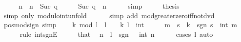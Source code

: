 \begin{isabellebody}
\ \ \isamarkupfalse%
\ \isamarkupfalse%
\ n\ \ {\isachardoublequoteopen}n\ {\isacharequal}{\kern0pt}\ Suc\ q{\isachardoublequoteclose}\isanewline
\ \ \isamarkupfalse%
\ \isamarkupfalse%
\ {\isachardoublequoteopen}Suc\ q\ {\isacharequal}{\kern0pt}\ n{\isachardoublequoteclose}\isanewline
\ \ \ \ \isamarkupfalse%
\ simp\isanewline
\ \ \isamarkupfalse%
\ \isamarkupfalse%
\ {\isacharquery}{\kern0pt}thesis\isanewline
\ \ \ \ \isamarkupfalse%
\ {\isacharparenleft}{\kern0pt}simp\ only{\isacharcolon}{\kern0pt}\ modulo{\isacharunderscore}{\kern0pt}int{\isacharunderscore}{\kern0pt}unfold{\isacharparenright}{\kern0pt}\isanewline
\ \ \ \ \ \ {\isacharparenleft}{\kern0pt}simp\ add{\isacharcolon}{\kern0pt}\ mod{\isacharunderscore}{\kern0pt}greater{\isacharunderscore}{\kern0pt}zero{\isacharunderscore}{\kern0pt}iff{\isacharunderscore}{\kern0pt}not{\isacharunderscore}{\kern0pt}dvd{\isacharparenright}{\kern0pt}\isanewline
{}\isamarkupfalse%
%
\endisatagproof
{\isafoldproof}%
%
\isadelimproof
\isanewline
%
\endisadelimproof
\isanewline
{}\isamarkupfalse%
\ pos{\isacharunderscore}{\kern0pt}mod{\isacharunderscore}{\kern0pt}sign\ {\isacharbrackleft}{\kern0pt}simp{\isacharbrackright}{\kern0pt}{\isacharcolon}{\kern0pt}\isanewline
\ \ {\isachardoublequoteopen}{}\ {\isasymle}\ k\ mod\ l{\isachardoublequoteclose}\ \ {\isachardoublequoteopen}l\ {\isachargreater}{\kern0pt}\ {}{\isachardoublequoteclose}\ \ k\ l\ {\isacharcolon}{\kern0pt}{\isacharcolon}{\kern0pt}\ int\isanewline
%
\isadelimproof
%
\endisadelimproof
%
\isatagproof
{}\isamarkupfalse%
\ {\isacharminus}{\kern0pt}\isanewline
\ \ \isamarkupfalse%
\ m\ \ s\ \ {\isachardoublequoteopen}k\ {\isacharequal}{\kern0pt}\ sgn\ s\ {\isacharasterisk}{\kern0pt}\ int\ m{\isachardoublequoteclose}\isanewline
\ \ \ \ \isamarkupfalse%
\ {\isacharparenleft}{\kern0pt}rule\ int{\isacharunderscore}{\kern0pt}sgnE{\isacharparenright}{\kern0pt}\isanewline
\ \ \isamarkupfalse%
\ \isamarkupfalse%
\ that\ \isamarkupfalse%
\ n\ \ {\isachardoublequoteopen}l\ {\isacharequal}{\kern0pt}\ sgn\ {}\ {\isacharasterisk}{\kern0pt}\ int\ n{\isachardoublequoteclose}\isanewline
\ \ \ \ \isamarkupfalse%
\ {\isacharparenleft}{\kern0pt}cases\ l{\isacharparenright}{\kern0pt}\ auto\isanewline

\end{isabellebody}
